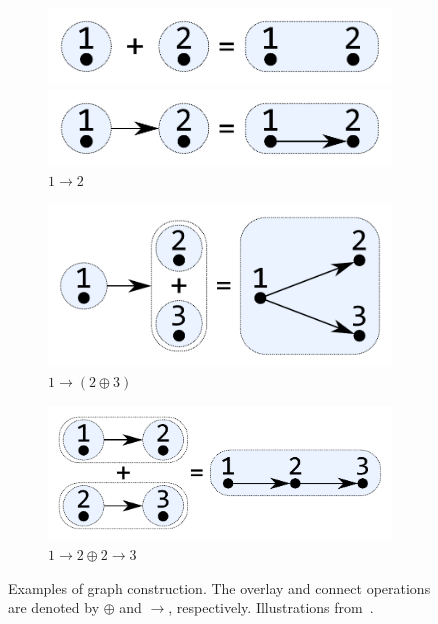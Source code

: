\documentclass{article}
\newcommand{\overlay}{\oplus}
\newcommand{\connect}{\rightarrow}
\begin{document}
\begin{figure}
  \centering
  \begin{subfigure}[b]{0.3\linewidth}
    \centerline{\includegraphics[scale=0.27]{fig/ex-a.pdf}}
    \vspace{-2.4mm}
    \caption{$1 \overlay 2$}
    \centerline{\includegraphics[scale=0.27]{fig/ex-b.pdf}}
    \vspace{-2.4mm}
    \caption{$1 \connect 2$}
  \end{subfigure}
  \begin{subfigure}[b]{0.3\linewidth}
    \centerline{\includegraphics[scale=0.27]{fig/ex-c.pdf}}
    \vspace{-1mm}
    \caption{$1 \connect (2 \overlay 3)$}
  \end{subfigure}
  \hspace{3mm}
  \begin{subfigure}[b]{0.3\linewidth}
    \centerline{\includegraphics[scale=0.27]{fig/ex-e-new.pdf}}
    \vspace{-1mm}
    \caption{$1 \connect 2 \overlay 2 \connect 3$}
  \end{subfigure}
  \caption{Examples of graph construction. The overlay and connect operations
    are denoted by $\overlay$ and $\connect$, respectively. Illustrations
    from~\cite{mokhov2017algebraic}.\label{fig:construction}} 
\end{figure}
\end{document}

